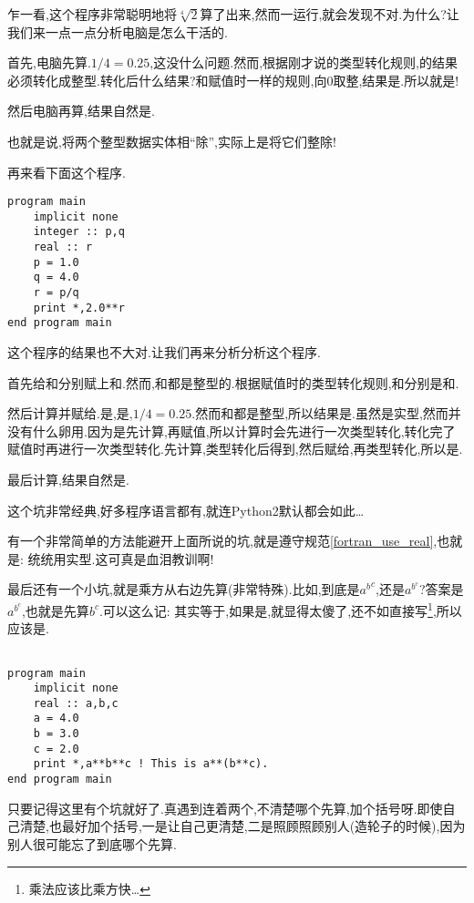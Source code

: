 乍一看,这个程序非常聪明地将$\sqrt[4]{2}$算了出来,然而一运行,就会发现不对.为什么?让我们来一点一点分析电脑是怎么干活的.

首先,电脑先算.$1/4=0.25$,这没什么问题.然而,根据刚才说的类型转化规则,的结果必须转化成整型.转化后什么结果?和赋值时一样的规则,向0取整,结果是.所以就是!

然后电脑再算,结果自然是.

也就是说,将两个整型数据实体相``除'',实际上是将它们整除!

再来看下面这个程序.

\begin{lstlisting}
program main
    implicit none
    integer :: p,q
    real :: r
    p = 1.0
    q = 4.0
    r = p/q
    print *,2.0**r
end program main
\end{lstlisting}
这个程序的结果也不大对.让我们再来分析分析这个程序.

首先给和分别赋上和.然而,和都是整型的.根据赋值时的类型转化规则,和分别是和.

然后计算并赋给.是,是,$1/4=0.25$.然而和都是整型,所以结果是.虽然是实型,然而并没有什么卵用.因为是先计算,再赋值,所以计算时会先进行一次类型转化,转化完了赋值时再进行一次类型转化.先计算,类型转化后得到,然后赋给,再类型转化,所以是.

最后计算,结果自然是.

这个坑非常经典,好多程序语言都有,就连Python2默认都会如此\dots

有一个非常简单的方法能避开上面所说的坑,就是遵守规范\ref{fortran_use_real},也就是: 统统用实型.这可真是血泪教训啊!

最后还有一个小坑,就是乘方从右边先算(非常特殊).比如,到底是${a^b}^c$,还是$a^{b^c}$?答案是$a^{b^c}$,也就是先算$b^c$.可以这么记: 其实等于,如果是,就显得太傻了,还不如直接写\footnote{
    乘法应该比乘方快\dots
},所以应该是.
\begin{lstlisting}

program main
    implicit none
    real :: a,b,c
    a = 4.0
    b = 3.0
    c = 2.0
    print *,a**b**c ! This is a**(b**c).
end program main
\end{lstlisting}

只要记得这里有个坑就好了.真遇到连着两个\ttt{**},不清楚哪个先算,加个括号呀.即使自己清楚,也最好加个括号,一是让自己更清楚,二是照顾照顾别人(造轮子的时候),因为别人很可能忘了到底哪个\ttt{**}先算.

